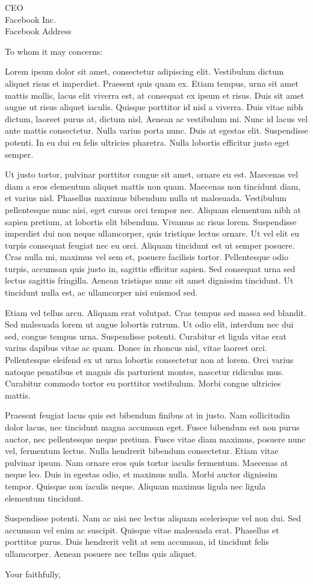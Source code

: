 \documentclass[12pt]{letter}
\begin{document}
\begin{letter}{CEO \\ Facebook Inc. \\ Facebook Address} %

\opening{To whom it may concerns:}
Lorem ipsum dolor sit amet, consectetur adipiscing elit. Vestibulum dictum aliquet risus et imperdiet. Praesent quis quam ex. Etiam tempus, urna sit amet mattis mollis, lacus elit viverra est, at consequat ex ipsum et risus. Duis sit amet augue ut risus aliquet iaculis. Quisque porttitor id nisl a viverra. Duis vitae nibh dictum, laoreet purus at, dictum nisl. Aenean ac vestibulum mi. Nunc id lacus vel ante mattis consectetur. Nulla varius porta nunc. Duis at egestas elit. Suspendisse potenti. In eu dui eu felis ultricies pharetra. Nulla lobortis efficitur justo eget semper.

Ut justo tortor, pulvinar porttitor congue sit amet, ornare eu est. Maecenas vel diam a eros elementum aliquet mattis non quam. Maecenas non tincidunt diam, et varius nisl. Phasellus maximus bibendum nulla ut malesuada. Vestibulum pellentesque nunc nisi, eget cursus orci tempor nec. Aliquam elementum nibh at sapien pretium, at lobortis elit bibendum. Vivamus ac risus lorem. Suspendisse imperdiet dui non neque ullamcorper, quis tristique lectus ornare. Ut vel elit eu turpis consequat feugiat nec eu orci. Aliquam tincidunt est ut semper posuere. Cras nulla mi, maximus vel sem et, posuere facilisis tortor. Pellentesque odio turpis, accumsan quis justo in, sagittis efficitur sapien. Sed consequat urna sed lectus sagittis fringilla. Aenean tristique nunc sit amet dignissim tincidunt. Ut tincidunt nulla est, ac ullamcorper nisi euismod sed.

Etiam vel tellus arcu. Aliquam erat volutpat. Cras tempus sed massa sed blandit. Sed malesuada lorem ut augue lobortis rutrum. Ut odio elit, interdum nec dui sed, congue tempus urna. Suspendisse potenti. Curabitur et ligula vitae erat varius dapibus vitae ac quam. Donec in rhoncus nisl, vitae laoreet orci. Pellentesque eleifend ex ut urna lobortis consectetur non at lorem. Orci varius natoque penatibus et magnis dis parturient montes, nascetur ridiculus mus. Curabitur commodo tortor eu porttitor vestibulum. Morbi congue ultricies mattis.

Praesent feugiat lacus quis est bibendum finibus at in justo. Nam sollicitudin dolor lacus, nec tincidunt magna accumsan eget. Fusce bibendum est non purus auctor, nec pellentesque neque pretium. Fusce vitae diam maximus, posuere nunc vel, fermentum lectus. Nulla hendrerit bibendum consectetur. Etiam vitae pulvinar ipsum. Nam ornare eros quis tortor iaculis fermentum. Maecenas at neque leo. Duis in egestas odio, et maximus nulla. Morbi auctor dignissim tempor. Quisque non iaculis neque. Aliquam maximus ligula nec ligula elementum tincidunt.

Suspendisse potenti. Nam ac nisi nec lectus aliquam scelerisque vel non dui. Sed accumsan vel enim ac suscipit. Quisque vitae malesuada erat. Phasellus et porttitor purus. Duis hendrerit velit at sem accumsan, id tincidunt felis ullamcorper. Aenean posuere nec tellus quis aliquet.

\closing{Your faithfully,}

\end{letter}
\end{document}
